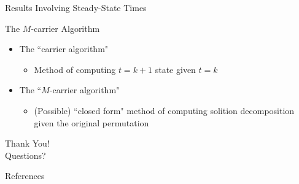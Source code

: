 \documentclass[aspectratio=169, serif]{beamer}
\begin{document}
\begin{frame}{Results Involving Steady-State Times}
      \begin{block}{The $M$-carrier Algorithm}
    \begin{itemize}
        \item The ``carrier algorithm"
        \begin{itemize}
            \item Method of computing $t=k+1$ state given $t=k$
        \end{itemize}
        \item The ``$M$-carrier algorithm"
        \begin{itemize}
            \item (Possible) ``closed form" method of computing solition decomposition given the original permutation
        \end{itemize}
    \end{itemize}
    \end{block}
\end{frame}

\begin{frame}[focus]
        Thank You! \\
        Questions?
\end{frame}
\begin{frame}[noframenumbering]{References}
    
    {}    
\end{frame}
\end{document}
